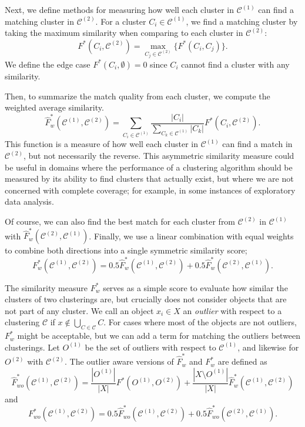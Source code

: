 \documentclass[review,los,12pt]{ryethesis}
\newcommand{\cC}{{\mathcal C}}
\newcommand\cCone{\mathcal{C}^{(1)}}
\newcommand\cCtwo{\mathcal{C}^{(2)}}
\begin{document}
Next, we define methods for measuring how well each cluster in $\cCone$ can find a matching cluster in $\cCtwo$.
For a cluster $C_i \in \cCone$, we find a matching cluster by taking the maximum similarity when comparing to each cluster in $\cCtwo$:
\begin{equation}
    F^*(C_i, \cCtwo) = \max_{C_j \in \cCtwo} \big\{ F^*(C_i, C_j) \big\}.
\end{equation}
We define the edge case $F^*(C_i, \emptyset) = 0$ since $C_i$ cannot find a cluster with any similarity.

Then, to summarize the match quality from each cluster, we compute the weighted average similarity.
\begin{equation}
    \hat{F}^{*}_w(\cCone, \cCtwo) = \sum_{C_i \in \cCone} \frac{|C_i|}{\sum_{C_k \in \cCone} |C_k|} F^*(C_i, \cCtwo).
\end{equation}
This function is a measure of how well each cluster in $\cCone$ can find a match in $\cCtwo$, but not necessarily the reverse.
This asymmetric similarity measure could be useful in domains where the performance of a clustering algorithm should be measured by its ability to find clusters that actually exist, but where we are not concerned with complete coverage; for example, in some instances of exploratory data analysis.

Of course, we can also find the best match for each cluster from $\cCtwo$ in $\cCone$ with $\hat{F}^*_w(\cCtwo, \cCone)$.
Finally, we use a linear combination with equal weights to combine both directions into a single symmetric similarity score;
\begin{equation}
    F^*_w(\cCone, \cCtwo) = 0.5 \hat{F}^{*}_w(\cCone, \cCtwo) + 0.5\hat{F}^{*}_w(\cCtwo, \cCone).
\end{equation}

The similarity measure $F^*_w$ serves as a simple score to evaluate how similar the clusters of two clusterings are, but crucially does not consider objects that are not part of any cluster.
We call an object $x_i \in X$ an \textit{outlier} with respect to a clustering $\cC$ if $x \not \in \bigcup_{C \in \cC} C$.
For cases where most of the objects are not outliers, $F^*_w$ might be acceptable, but we can add a term for matching the outliers between clusterings.
Let $O^{(1)}$ be the set of outliers with respect to $\cCone$, and likewise for $O^{(2)}$ with $\cCtwo$.
The outlier aware versions of $\hat{F}^*_w$ and $F^*_w$ are defined as
\begin{equation}
    \hat{F}^{*}_{wo}(\cCone, \cCtwo) = \frac{|O^{(1)}|}{|X|} F^*(O^{(1)}, O^{(2)}) + \frac{|X \setminus O^{(1)}|}{|X|} \hat{F}^{*}_w(\cCone, \cCtwo)
\end{equation}
and
\begin{equation}
    F^*_{wo}(\cCone, \cCtwo) = 0.5\hat{F}^*_{wo}(\cCone, \cCtwo) + 0.5\hat{F}^*_{wo}(\cCtwo, \cCone).
\end{equation}
\end{document}
